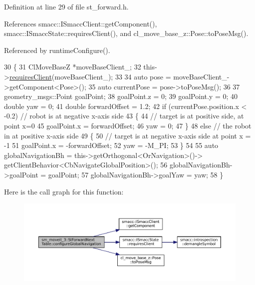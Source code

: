 Definition at line 29 of file st\+\_\+forward.\+h.



References smacc\+::\+I\+Smacc\+Client\+::get\+Component(), smacc\+::\+I\+Smacc\+State\+::requires\+Client(), and cl\+\_\+move\+\_\+base\+\_\+z\+::\+Pose\+::to\+Pose\+Msg().



Referenced by runtime\+Configure().


\begin{DoxyCode}
30   \{
31     ClMoveBaseZ *moveBaseClient\_;
32     this->\hyperlink{classsmacc_1_1ISmaccState_a7f95c9f0a6ea2d6f18d1aec0519de4ac}{requiresClient}(moveBaseClient\_);
33 
34     \textcolor{keyword}{auto} pose = moveBaseClient\_->getComponent<Pose>();
35     \textcolor{keyword}{auto} currentPose = pose->toPoseMsg();
36 
37     geometry\_msgs::Point goalPoint;
38     goalPoint.z = 0;
39     goalPoint.y = 0;
40     \textcolor{keywordtype}{double} yaw = 0;
41     \textcolor{keywordtype}{double} forwardOffset = 1.2;
42     \textcolor{keywordflow}{if} (currentPose.position.x < -0.2)  \textcolor{comment}{// robot is at negative x-axis side}
43     \{
44       \textcolor{comment}{// target is at positive side, at point x=0}
45       goalPoint.x = forwardOffset;
46       yaw = 0;
47     \}
48     \textcolor{keywordflow}{else}  \textcolor{comment}{// the robot in at positive x-axis side}
49     \{
50       \textcolor{comment}{// target is at negative x-axis side at point x = -1}
51       goalPoint.x = -forwardOffset;
52       yaw = -M\_PI;
53     \}
54 
55     \textcolor{keyword}{auto} globalNavigationBh = this->getOrthogonal<OrNavigation>()->
      getClientBehavior<CbNavigateGlobalPosition>();
56     globalNavigationBh->goalPoint = goalPoint;
57     globalNavigationBh->goalYaw = yaw;
58   \}
\end{DoxyCode}
Here is the call graph for this function\+:
\nopagebreak
\begin{figure}[H]
\begin{center}
\leavevmode
\includegraphics[width=350pt]{structsm__moveit__3_1_1StForwardNextTable_a0027b604f471fad11d66c027a3ef662a_cgraph}
\end{center}
\end{figure}
